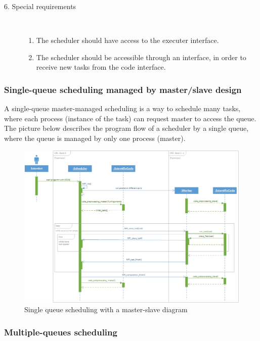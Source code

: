 \begin{description}
	\item [6. Special requirements]\hfill \\
	\vspace{-6.5mm}
	\begin{enumerate}
		\item The scheduler should have access to the executer interface.
		\item The scheduler should be accessible through an interface, in order to receive new tasks from the code interface.
	\end{enumerate}
	
\end{description}
\vspace{0.5cm}
\subsubsection{Single-queue scheduling managed by master/slave design }
\vspace{0.5cm}
A single-queue master-managed scheduling is a way to schedule many tasks, where each process (instance of the task) can request master to access the queue. The picture below describes the program flow of a scheduler by a single queue, where the queue is managed by only one process (master). 
\vspace{1cm}
	\begin{figure}[H]
	\centering
	\includegraphics[width=15cm]{images/Master-slave.jpg}
	\caption{Single queue scheduling with a master-slave diagram} 
	\end{figure}
\newpage
\subsubsection{Multiple-queues scheduling}

